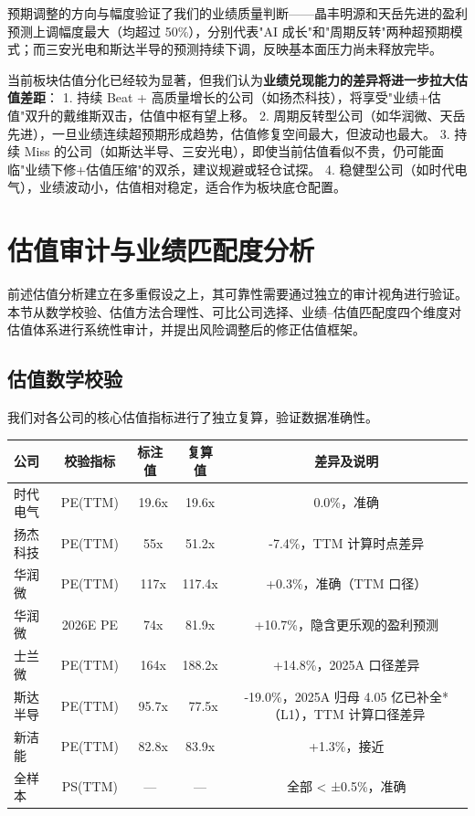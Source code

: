 预期调整的方向与幅度验证了我们的业绩质量判断——晶丰明源和天岳先进的盈利预测上调幅度最大（均超过 50\%），分别代表"AI 成长"和"周期反转"两种超预期模式；而三安光电和斯达半导的预测持续下调，反映基本面压力尚未释放完毕。

\begin{keyinsight}[业绩兑现将成为估值分化的核心驱动力]
当前板块估值分化已经较为显著，但我们认为\textbf{业绩兑现能力的差异将进一步拉大估值差距}：
1. 持续 Beat + 高质量增长的公司（如扬杰科技），将享受"业绩+估值"双升的戴维斯双击，估值中枢有望上移。
2. 周期反转型公司（如华润微、天岳先进），一旦业绩连续超预期形成趋势，估值修复空间最大，但波动也最大。
3. 持续 Miss 的公司（如斯达半导、三安光电），即使当前估值看似不贵，仍可能面临"业绩下修+估值压缩"的双杀，建议规避或轻仓试探。
4. 稳健型公司（如时代电气），业绩波动小，估值相对稳定，适合作为板块底仓配置。
\end{keyinsight}

\section{估值审计与业绩匹配度分析}

前述估值分析建立在多重假设之上，其可靠性需要通过独立的审计视角进行验证。本节从数学校验、估值方法合理性、可比公司选择、业绩--估值匹配度四个维度对估值体系进行系统性审计，并提出风险调整后的修正估值框架。

\subsection{估值数学校验}

我们对各公司的核心估值指标进行了独立复算，验证数据准确性。

\begin{exhibitbox}[表 7-9：核心估值指标数学校验结果]
\centering
\small
\begin{tabularx}{\textwidth}{X c c c c}
\toprule
\textbf{公司} & \textbf{校验指标} & \textbf{标注值} & \textbf{复算值} & \textbf{差异及说明} \\
\midrule
\rowcolor{riskgreen!10}
时代电气 & PE(TTM) & ~19.6x & 19.6x & 0.0\%，准确 \\
\rowcolor{riskgreen!10}
扬杰科技 & PE(TTM) & ~55x & 51.2x & -7.4\%，TTM 计算时点差异 \\
\rowcolor{riskamber!10}
华润微 & PE(TTM) & ~117x & 117.4x & +0.3\%，准确（TTM 口径） \\
\rowcolor{riskamber!10}
华润微 & 2026E PE & ~74x & 81.9x & +10.7\%，隐含更乐观的盈利预测 \\
\rowcolor{riskamber!10}
士兰微 & PE(TTM) & ~164x & 188.2x & +14.8\%，2025A 口径差异 \\
\rowcolor{riskamber!10}
斯达半导 & PE(TTM) & ~95.7x & ~77.5x & -19.0\%，2025A 归母 4.05 亿已补全*（L1），TTM 计算口径差异 \\
\rowcolor{riskgreen!10}
新洁能 & PE(TTM) & ~82.8x & 83.9x & +1.3\%，接近 \\
\rowcolor{riskgreen!10}
全样本 & PS(TTM) & — & — & 全部 < ±0.5\%，准确 \\
\bottomrule
\end{tabularx}
\end{exhibitbox}

